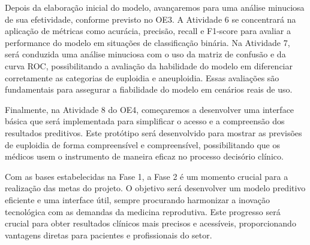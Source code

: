 Depois da elaboração inicial do modelo, avançaremos para uma análise minuciosa de sua efetividade, conforme previsto no OE3. A Atividade 6 se concentrará na aplicação de métricas como acurácia, precisão, recall e F1-score para avaliar a performance do modelo em situações de classificação binária. Na Atividade 7, será conduzida uma análise minuciosa com o uso da matriz de confusão e da curva ROC, possibilitando a avaliação da habilidade do modelo em diferenciar corretamente as categorias de euploidia e aneuploidia. Essas avaliações são fundamentais para assegurar a fiabilidade do modelo em cenários reais de uso.

Finalmente, na Atividade 8 do OE4, começaremos a desenvolver uma interface básica que será implementada para simplificar o acesso e a compreensão dos resultados preditivos. Este protótipo será desenvolvido para mostrar as previsões de euploidia de forma compreensível e compreensível, possibilitando que os médicos usem o instrumento de maneira eficaz no processo decisório clínico. 

Com as bases estabelecidas na Fase 1, a Fase 2 é um momento crucial para a realização das metas do projeto. O objetivo será desenvolver um modelo preditivo eficiente e uma interface útil, sempre procurando harmonizar a inovação tecnológica com as demandas da medicina reprodutiva. Este progresso será crucial para obter resultados clínicos mais precisos e acessíveis, proporcionando vantagens diretas para pacientes e profissionais do setor.


